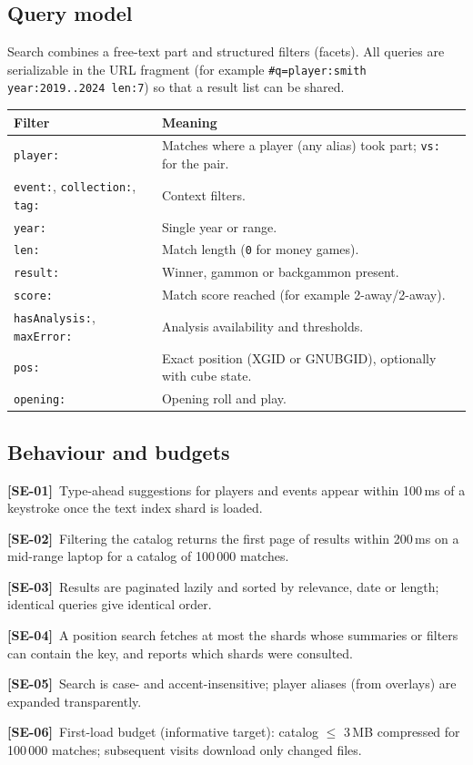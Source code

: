 \documentclass[11pt,a4paper]{article}
\newcommand{\req}[2]{\par\smallskip\noindent\hypertarget{#1}{}\textbf{[#1]}\ #2\par}
\begin{document}
\subsection{Query model}
Search combines a free-text part and structured filters (facets). All queries are serializable in the URL fragment (for example \texttt{\#q=player:smith year:2019..2024 len:7}) so that a result list can be shared.
\begin{longtable}{@{}p{3.6cm}p{10.7cm}@{}}
\toprule
\textbf{Filter} & \textbf{Meaning}\\
\midrule
\endhead
\texttt{player:} & Matches where a player (any alias) took part; \texttt{vs:} for the pair.\\
\texttt{event:}, \texttt{collection:}, \texttt{tag:} & Context filters.\\
\texttt{year:} & Single year or range.\\
\texttt{len:} & Match length (\texttt{0} for money games).\\
\texttt{result:} & Winner, gammon or backgammon present.\\
\texttt{score:} & Match score reached (for example 2-away/2-away).\\
\texttt{hasAnalysis:}, \texttt{maxError:} & Analysis availability and thresholds.\\
\texttt{pos:} & Exact position (XGID or GNUBGID), optionally with cube state.\\
\texttt{opening:} & Opening roll and play.\\
\bottomrule
\end{longtable}

\subsection{Behaviour and budgets}
\req{SE-01}{Type-ahead suggestions for players and events appear within 100\,ms of a keystroke once the text index shard is loaded.}
\req{SE-02}{Filtering the catalog returns the first page of results within 200\,ms on a mid-range laptop for a catalog of 100\,000 matches.}
\req{SE-03}{Results are paginated lazily and sorted by relevance, date or length; identical queries give identical order.}
\req{SE-04}{A position search fetches at most the shards whose summaries or filters can contain the key, and reports which shards were consulted.}
\req{SE-05}{Search is case- and accent-insensitive; player aliases (from overlays) are expanded transparently.}
\req{SE-06}{First-load budget (informative target): catalog $\leq$ 3\,MB compressed for 100\,000 matches; subsequent visits download only changed files.}
\end{document}
